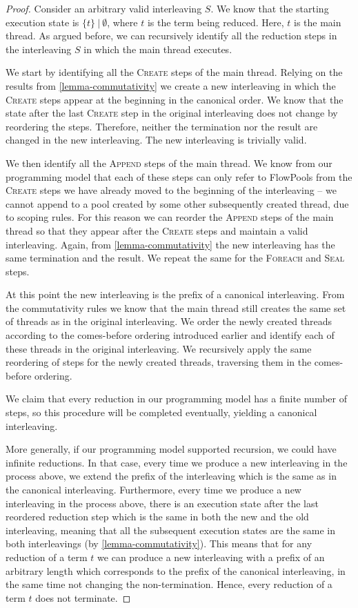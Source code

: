 \documentclass[runningheads,a4paper]{llncs}
\newcommand{\set}[1]{\{#1\}}
\begin{document}
\begin{proof}
Consider an arbitrary valid interleaving $S$.
We know that the starting execution state is $\set{t}~|~\emptyset$, where
$t$ is the term being reduced.
Here, $t$ is the main thread.
As argued before, we can recursively identify all the reduction steps
in the interleaving $S$ in which the main thread executes.

We start by identifying all the \textsc{Create} steps of the main
thread.
Relying on the results from \ref{lemma-commutativity} we create a new
interleaving in which the \textsc{Create} steps appear at the
beginning in the canonical order.
We know that the state after the last \textsc{Create} step in the
original interleaving does not change by reordering the steps.
Therefore, neither the termination nor the result are changed in the
new interleaving.
The new interleaving is trivially valid.

We then identify all the \textsc{Append} steps of the main thread.
We know from our programming model that each of these steps can only
refer to FlowPools from the \textsc{Create} steps we have already
moved to the beginning of the interleaving -- we cannot append to a
pool created by some other subsequently created thread, due to scoping
rules.
For this reason we can reorder the \textsc{Append} steps of the main
thread so that they appear after the \textsc{Create} steps and
maintain a valid interleaving.
Again, from \ref{lemma-commutativity} the new interleaving has the
same termination and the result.
We repeat the same for the \textsc{Foreach} and \textsc{Seal} steps.

At this point the new interleaving is the prefix of a canonical
interleaving.
From the commutativity rules we know that the main thread still
creates the same set of threads as in the original interleaving.
We order the newly created threads according to the comes-before
ordering introduced earlier and identify each of these threads in the
original interleaving.
We recursively apply the same reordering of steps for the newly
created threads, traversing them in the comes-before ordering.

We claim that every reduction in our programming model has a finite
number of steps, so this procedure will be completed eventually,
yielding a canonical interleaving.

More generally, if our programming model supported recursion, we
could have infinite reductions.
In that case, every time we produce a new interleaving in the process
above, we extend the prefix of the interleaving which is the same as
in the canonical interleaving.
Furthermore, every time we produce a new interleaving in the process
above, there is an execution state after the last reordered reduction
step which is the same in both the new and the old interleaving,
meaning that all the subsequent execution states are the same in both
interleavings (by \ref{lemma-commutativity}).
This means that for any reduction of a term $t$ we can produce a new
interleaving with a prefix of an arbitrary length which corresponds to
the prefix of the canonical interleaving, in the same time not
changing the non-termination.
Hence, every reduction of a term $t$ does not terminate.
\end{proof}
\end{document}
